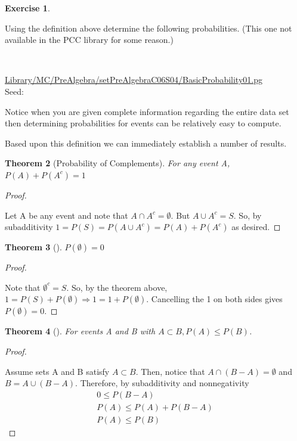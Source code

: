 \documentclass[10pt,]{book}
\theoremstyle{plain}
\newtheorem{theorem}{Theorem}[section]
\theoremstyle{definition}
\theoremstyle{definition}
\theoremstyle{definition}
\newtheorem{exercise}[theorem]{Exercise}
\numberwithin{equation}{section}
\begin{document}
\begin{exercise}\label{exercise-15}

		Using the definition above determine the following probabilities.  (This one not available
		in the PCC library for some reason.)
\par\medskip
\mbox{}\\ %
\begin{mdframed}
{}\par\vspace*{2ex}%
{\tiny\ttfamily\noindent\url{Library/MC/PreAlgebra/setPreAlgebraC06S04/BasicProbability01.pg}\\Seed: \hfill}\end{mdframed}
\medskip\noindent 
		Notice when you are given complete information regarding the entire data set then determining
		probabilities for events can be relatively easy to compute.
\par
\end{exercise}
\par
Based upon this definition we can immediately establish a number of results.%
\begin{theorem}[{Probability of Complements}]\label{ProbabilityComplemnts}
 For any event A, \(P(A) + P(A^c) = 1\)\end{theorem}
\begin{proof}\hypertarget{proof-11}{}
Let A be any event and note that \(A \cap A^c = \emptyset\).  But \(A \cup A^c = S\).
			So, by subadditivity \(1 = P(S) = P(A \cup A^c) = P(A) + P(A^c)\) as desired.%
\end{proof}
\begin{theorem}[{}]\label{ProbabilityEmptySet}
\(P(\emptyset) = 0\)\end{theorem}
\begin{proof}\hypertarget{proof-12}{}
Note that \(\emptyset^c = S\). So, by the theorem above, 
			\(1 = P(S) + P(\emptyset) \Rightarrow 1 = 1 + P(\emptyset)\).
			Cancelling the 1 on both sides gives \(P(\emptyset) = 0\). %
\end{proof}
\begin{theorem}[{}]\label{ProbabilityContainment}
For events A and B with \( A \subset B, P(A) \le P(B)\).
		\end{theorem}
\begin{proof}\hypertarget{proof-13}{}
Assume sets A and B satisfy \( A \subset B\). Then, notice that
			\(A \cap (B-A) = \emptyset\) and  \(B = A \cup (B-A)\). Therefore, by 
			subadditivity and nonnegativity%
\begin{gather*}
0 \le P(B-A)\\
P(A) \le P(A) + P(B-A) \\
P(A) \le P(B)
\end{gather*}\end{proof}
\end{document}
